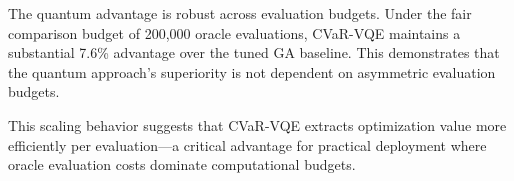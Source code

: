 The quantum advantage is robust across evaluation budgets. Under the fair comparison budget of 200{,}000 oracle evaluations, CVaR-VQE 
maintains a substantial 7.6\% advantage over the tuned GA baseline. This 
demonstrates that the quantum approach's superiority is not dependent on 
asymmetric evaluation budgets.

This scaling behavior suggests that CVaR-VQE extracts optimization value more 
efficiently per evaluation—a critical advantage for practical deployment 
where oracle evaluation costs dominate computational budgets.









